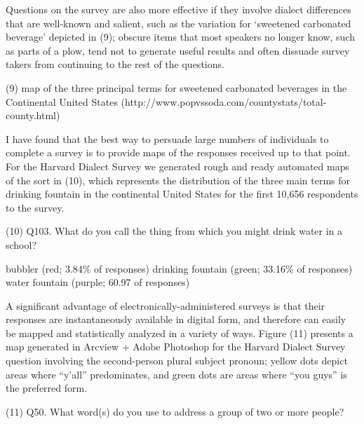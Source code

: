 Questions on the survey are also more effective if they involve dialect differences that are well-known and salient, such as the variation for ‘sweetened carbonated beverage’ depicted in (9); obscure items that most speakers no longer know, such as parts of a plow, tend not to generate useful results and often dissuade survey takers from continuing to the rest of the questions.

\begin{exe}

(9) map of the three principal terms for sweetened carbonated beverages in the Continental United States (http://www.popvssoda.com/countystats/total-county.html)



\end{exe}

I have found that the best way to persuade large numbers of individuals to complete a survey is to provide maps of the responses received up to that point. For the Harvard Dialect Survey we generated rough and ready automated maps of the sort in (10), which represents the distribution of the three main terms for drinking fountain in the continental United States for the first 10,656 respondents to the survey.

\begin{exe}
	
	(10) Q103. What do you call the thing from which you might drink water in a school?
	
	bubbler (red; 3.84\% of responses)
	drinking fountain (green; 33.16\% of responses)
	water fountain (purple; 60.97 of responses)
	
	
\end{exe}

A significant advantage of electronically-administered surveys is that their responses are instantaneously available in digital form, and therefore can easily be mapped and statistically analyzed in a variety of ways. Figure (11) presents a map generated in Arcview + Adobe Photoshop for the Harvard Dialect Survey question involving the second-person plural subject pronoun; yellow dots depict areas where “y’all” predominates, and green dots are areas where “you guys” is the preferred form.

\begin{exe}
	
	
	(11)	Q50. What word(s) do you use to address a group of two or more people?
	
	
\end{exe}

